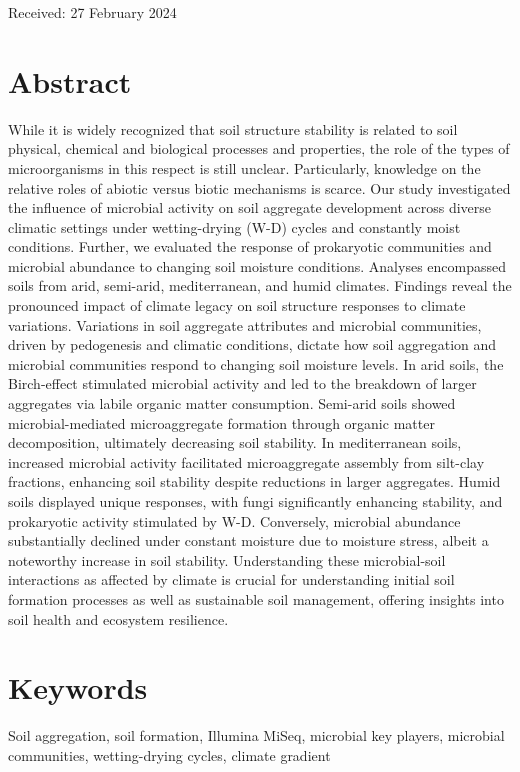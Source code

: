   \vspace{0.5cm}
  \begin{center}
    Received: 27 February 2024
  \end{center}
  \cleardoublepage

\section*{Abstract}

While it is widely recognized that soil structure stability is related to soil physical, chemical and biological processes and properties, the role of the types of microorganisms in this respect is still unclear. Particularly, knowledge on the relative roles of abiotic versus biotic mechanisms is scarce. Our study investigated the influence of microbial activity on soil aggregate development across diverse climatic settings under wetting-drying (W-D) cycles and constantly moist conditions. Further, we evaluated the response of prokaryotic communities and microbial abundance to changing soil moisture conditions. Analyses encompassed soils from arid, semi-arid, mediterranean, and humid climates. Findings reveal the pronounced impact of climate legacy on soil structure responses to climate variations. Variations in soil aggregate attributes and microbial communities, driven by pedogenesis and climatic conditions, dictate how soil aggregation and microbial communities respond to changing soil moisture levels. In arid soils, the Birch-effect stimulated microbial activity and led to the breakdown of larger aggregates via labile organic matter consumption. Semi-arid soils showed microbial-mediated microaggregate formation through organic matter decomposition, ultimately decreasing soil stability. In mediterranean soils, increased microbial activity facilitated microaggregate assembly from silt-clay fractions, enhancing soil stability despite reductions in larger aggregates. Humid soils displayed unique responses, with fungi significantly enhancing stability, and prokaryotic activity stimulated by W-D. Conversely, microbial abundance substantially declined under constant moisture due to moisture stress, albeit a noteworthy increase in soil stability. Understanding these microbial-soil interactions as affected by climate is crucial for understanding initial soil formation processes as well as sustainable soil management, offering insights into soil health and ecosystem resilience.

\section*{Keywords} %
Soil aggregation, soil formation, Illumina MiSeq, microbial key players, microbial communities, wetting-drying cycles, climate gradient

